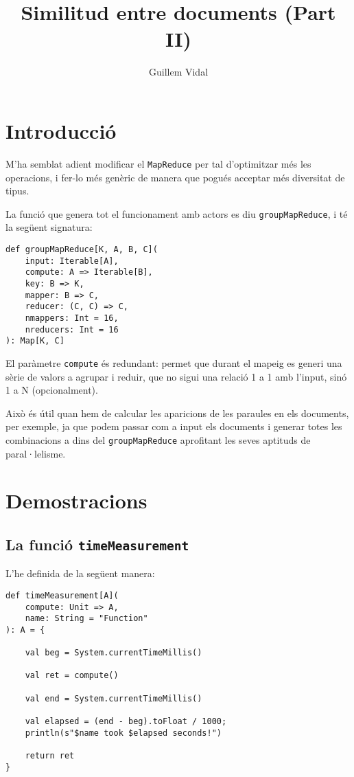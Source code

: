 \documentclass{article}
\begin{document}
\title{Similitud entre documents (Part II)}
\author{Guillem Vidal}
\maketitle

\section{Introducció}

M'ha semblat adient modificar el \lstinline{MapReduce} per tal d'optimitzar més
les operacions, i fer-lo més genèric de manera que pogués acceptar més diversitat
de tipus.

La funció que genera tot el funcionament amb actors es diu \lstinline{groupMapReduce},
i té la següent signatura:

\begin{lstlisting}
def groupMapReduce[K, A, B, C](
	input: Iterable[A],
	compute: A => Iterable[B],
	key: B => K,
	mapper: B => C,
	reducer: (C, C) => C,
	nmappers: Int = 16,
	nreducers: Int = 16
): Map[K, C]
\end{lstlisting}

El paràmetre \lstinline{compute} és redundant: permet que durant el mapeig es
generi una sèrie de valors a agrupar i reduir, que no sigui una relació 1 a 1
amb l'input, sinó 1 a N (opcionalment).

Això és útil quan hem de calcular les aparicions de les paraules en els
documents, per exemple, ja que podem passar com a input els documents i generar
totes les combinacions a dins del \lstinline{groupMapReduce} aprofitant les
seves aptituds de paral·lelisme.

\section{Demostracions}

\subsection{La funció \lstinline{timeMeasurement}}

L'he definida de la següent manera:

\begin{lstlisting}
def timeMeasurement[A](
	compute: Unit => A,
	name: String = "Function"
): A = {

	val beg = System.currentTimeMillis()

	val ret = compute()

	val end = System.currentTimeMillis()

	val elapsed = (end - beg).toFloat / 1000;
	println(s"$name took $elapsed seconds!")

	return ret
}
\end{lstlisting}
\end{document}
